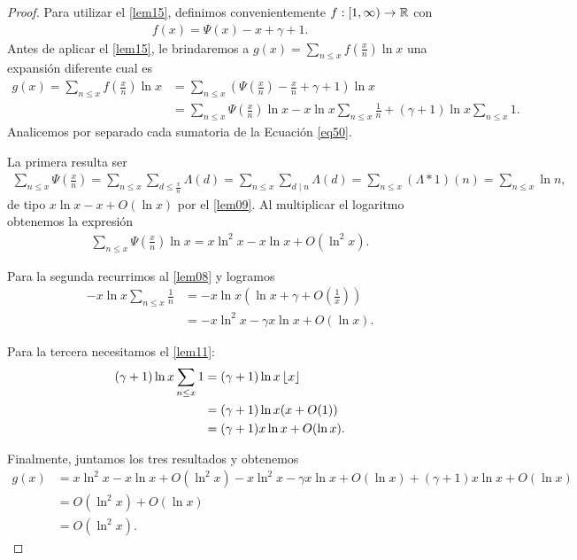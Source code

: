 \begin{proof}
Para utilizar el \cref{lem15}, definimos convenientemente $f : [1, \infty) \to \mathbb{R}$ con
\begin{align}
f(x) = \Psi(x) - x + \gamma + 1.
\end{align}
Antes de aplicar el \cref{lem15}, le brindaremos a $g(x) = \sum_{n \leq x} f\left(\frac{x}{n}\right)\ln x$ 
una expansi\'on diferente cual es 
\begin{align}
g(x)= \sum_{n \leq x} f\left(\frac{x}{n}\right)\ln x &= \sum_{n \leq x} \left(\Psi\left(\frac{x}{n}\right) - \frac{x}{n} + \gamma + 1\right) \ln x \\
&= \sum_{n \leq x} \Psi\left(\frac{x}{n}\right) \ln x - x \ln x \sum_{n \leq x} \frac{1}{n} + (\gamma + 1) \ln x \sum_{n \leq x} 1.\label{eq50}
\end{align}
Analicemos por separado cada sumatoria de la Ecuaci\'on \ref{eq50}.

La primera resulta ser 
\begin{align}
\sum_{n \leq x} \Psi\left(\frac{x}{n}\right) = \sum_{n \leq x} \sum_{d \leq \frac{x}{n}} \Lambda(d) = 
 \sum_{n \leq x} \sum_{d \mid n} \Lambda(d) = 
 \sum_{n \leq x} (\Lambda * 1)(n) = 
\sum_{n \leq x} \ln n, 
\end{align}
de tipo $x\ln x - x + O(\ln x)$ por el \cref{lem09}.
Al multiplicar el logaritmo obtenemos la expresi\'on
\begin{align}
\sum_{n \leq x} \Psi\left(\frac{x}{n}\right)\ln x = x \ln^2 x - x \ln x + O(\ln^2 x).
\end{align}

Para la segunda recurrimos al \cref{lem08} y logramos 
\begin{align}
-x \ln x \sum_{n \leq x} \frac{1}{n} &= -x \ln x \left(\ln x + \gamma + O\left(\frac{1}{x}\right)\right) \\
&= -x \ln^2 x - \gamma x \ln x + O(\ln x).
\end{align}

Para la tercera necesitamos el \cref{lem11}: 
\begin{align}
(\gamma + 1) \ln x \sum_{n \leq x} 1 &= (\gamma + 1) \ln x \left\lfloor x \right\rfloor \\
&= (\gamma + 1) \ln x (x + O(1)) \\
&= (\gamma + 1) x \ln x + O(\ln x).
\end{align}

Finalmente, juntamos los tres resultados y obtenemos
\begin{align}
g(x) &= x \ln^2 x - x \ln x + O(\ln^2 x) - x \ln^2 x - \gamma x \ln x + O(\ln x) + (\gamma + 1) x \ln x + O(\ln x) \\
&= O(\ln^2 x) + O(\ln x) \\
&= O(\ln^2 x). 
\end{align}


\end{proof}
